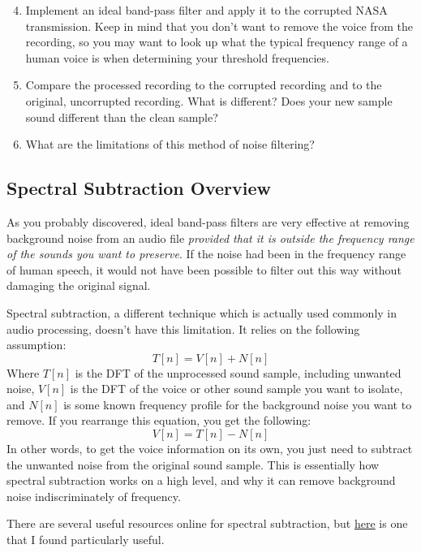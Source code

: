 \documentclass{tufte-handout}
\begin{document}
\begin{enumerate}
	\setcounter{enumi}{3}
	\item Implement an ideal band-pass filter and apply it to the corrupted NASA transmission. Keep in mind that you don't want to remove the voice from the recording, so you may want to look up what the typical frequency range of a human voice is when determining your threshold frequencies.
	\item Compare the processed recording to the corrupted recording and to the original, uncorrupted recording. What is different? Does your new sample sound different than the clean sample?
	\item What are the limitations of this method of noise filtering?
\end{enumerate}

\subsection{Spectral Subtraction Overview}
As you probably discovered, ideal band-pass filters are very effective at removing background noise from an audio file \textit{provided that it is outside the frequency range of the sounds you want to preserve}. If the noise had been in the frequency range of human speech, it would not have been possible to filter out this way without damaging the original signal.

Spectral subtraction, a different technique which is actually used commonly in audio processing, doesn't have this limitation. It relies on the following assumption:
\begin{equation}
	T[n] = V[n] + N[n]
\end{equation}
Where $T[n]$  is the DFT of the unprocessed sound sample, including unwanted noise, $V[n]$ is the DFT of the voice or other sound sample you want to isolate, and $N[n]$ is some known frequency profile for the background noise you want to remove. If you rearrange this equation, you get the following:
\begin{equation}
	V[n] = T[n] - N[n]
\end{equation}
In other words, to get the voice information on its own, you just need to subtract the unwanted noise from the original sound sample. This is essentially how spectral subtraction works on a high level, and why it can remove background noise indiscriminately of frequency.

There are several useful resources online for spectral subtraction, but \href{http://practicalcryptography.com/miscellaneous/machine-learning/tutorial-spectral-subraction/}{here} is one that I found particularly useful.
\end{document}
